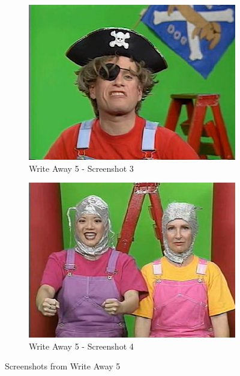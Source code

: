 \begin{figure}[H]
    \begin{subfigure}{0.45\textwidth}
        \centering
        \includegraphics[width=\linewidth]{Games/WriteAway/Images/WriteAway5Screenshot3.png}
        \caption{Write Away 5 - Screenshot 3}
    \end{subfigure}
    \begin{subfigure}{0.45\textwidth}
        \centering
        \includegraphics[width=\linewidth]{Games/WriteAway/Images/WriteAway5Screenshot4.png}
        \caption{Write Away 5 - Screenshot 4}
    \end{subfigure}
    \caption{Screenshots from Write Away 5}
\end{figure}
